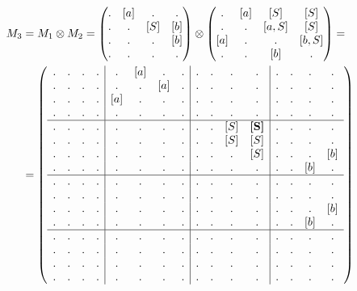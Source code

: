 \begin{example}
\begin{align}
M_3 &= M_1 \otimes M_2 = 
\begin{pmatrix} 
. & [a] & . & . \\
. & . & [S] & [b] \\
. & . & . & [b] \\
. & . & . & . 
\end{pmatrix}
\otimes 
\begin{pmatrix} 
. & [a] & [S] & [S] \\
. & . & [a,S] & [S] \\
[a] & . & . & [b,S] \\
. & . & [b] & . 
\end{pmatrix}
=\notag\\
&=
\left(\begin{array}{c c c c | c c c c | c c c c | c c c c } 
. & . & . & .  &  . & [a] & . & .  &  . & . & . & .    &  . & . & . & .   \\
. & . & . & .  &  . & . & [a] & .  &  . & . & . & .    &  . & . & . & .   \\
. & . & . & .  &  [a] & . & . & .  &  . & . & . & .    &  . & . & . & .   \\
. & . & . & .  &  . & . & . & .    &  . & . & . & .    &  . & . & . & .   \\
\hline
. & . & . & .  &  . & . & . & .    &  . & . & [S] & \textbf{[S]}    &  . & . & . & .   \\
. & . & . & .  &  . & . & . & .    &  . & . & [S] & [S]             &  . & . & . & .   \\
. & . & . & .  &  . & . & . & .    &  . & . & .   & [S]             &  . & . & . & [b] \\
. & . & . & .  &  . & . & . & .    &  . & . & .   & .               &  . & . & [b] & . \\
\hline
. & . & . & .  &  . & . & . & .    &  . & . & . & .    &  . & . & . & .   \\
. & . & . & .  &  . & . & . & .    &  . & . & . & .    &  . & . & . & .   \\
. & . & . & .  &  . & . & . & .    &  . & . & . & .    &  . & . & . & [b] \\
. & . & . & .  &  . & . & . & .    &  . & . & . & .    &  . & . & [b] & . \\
\hline
. & . & . & .  &  . & . & . & .    &  . & . & . & .    &  . & . & . & .   \\
. & . & . & .  &  . & . & . & .    &  . & . & . & .    &  . & . & . & .   \\
. & . & . & .  &  . & . & . & .    &  . & . & . & .    &  . & . & . & .   \\
. & . & . & .  &  . & . & . & .    &  . & . & . & .    &  . & . & . & . 
\end{array}\right)
\label{eq:graph_tm}
\end{align}


\end{example}
